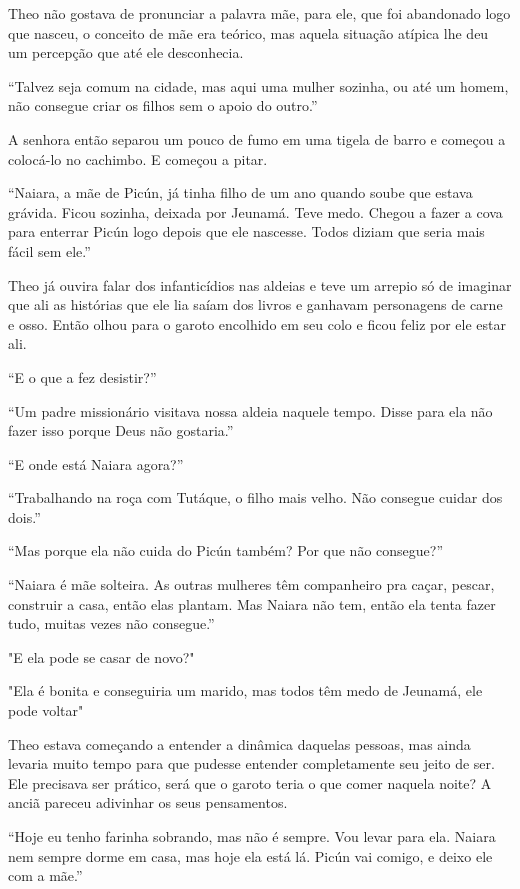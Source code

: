 Theo não gostava de pronunciar a palavra mãe, para ele, que foi
abandonado logo que nasceu, o conceito de mãe era teórico, mas aquela
situação atípica lhe deu um percepção que até ele desconhecia.

``Talvez seja comum na cidade, mas aqui uma mulher sozinha, ou até um
homem, não consegue criar os filhos sem o apoio do outro.''

A senhora então separou um pouco de fumo em uma tigela de barro e
começou a colocá-lo no cachimbo. E começou a pitar.

``Naiara, a mãe de Picún, já tinha filho de um ano quando soube que
estava grávida. Ficou sozinha, deixada por Jeunamá. Teve medo. Chegou a
fazer a cova para enterrar Picún logo depois que ele nascesse. Todos
diziam que seria mais fácil sem ele.''

Theo já ouvira falar dos infanticídios nas aldeias e teve um arrepio só
de imaginar que ali as histórias que ele lia saíam dos livros e ganhavam
personagens de carne e osso. Então olhou para o garoto encolhido em seu
colo e ficou feliz por ele estar ali.

``E o que a fez desistir?''

``Um padre missionário visitava nossa aldeia naquele tempo. Disse para
ela não fazer isso porque Deus não gostaria.''

``E onde está Naiara agora?''

``Trabalhando na roça com Tutáque, o filho mais velho. Não consegue
cuidar dos dois.''

``Mas porque ela não cuida do Picún também? Por que não consegue?''

``Naiara é mãe solteira. As outras mulheres têm companheiro pra caçar,
pescar, construir a casa, então elas plantam. Mas Naiara não tem, então
ela tenta fazer tudo, muitas vezes não consegue.''

"E ela pode se casar de novo?"

"Ela é bonita e conseguiria um marido, mas todos têm medo de Jeunamá,
ele pode voltar"

Theo estava começando a entender a dinâmica daquelas pessoas, mas ainda
levaria muito tempo para que pudesse entender completamente seu jeito de
ser. Ele precisava ser prático, será que o garoto teria o que comer
naquela noite? A anciã pareceu adivinhar os seus pensamentos.

``Hoje eu tenho farinha sobrando, mas não é sempre. Vou levar para ela.
Naiara nem sempre dorme em casa, mas hoje ela está lá. Picún vai comigo,
e deixo ele com a mãe.''

